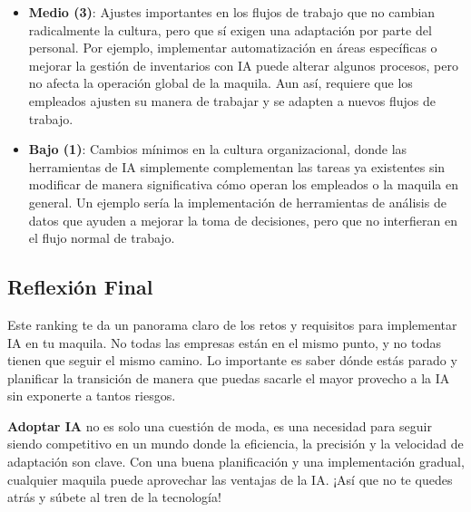 \begin{enumerate}
\begin{itemize}
        \item \textbf{Medio (3)}: Ajustes importantes en los flujos de trabajo que no cambian radicalmente la cultura, pero que sí exigen una adaptación por parte del personal. Por ejemplo, implementar automatización en áreas específicas o mejorar la gestión de inventarios con IA puede alterar algunos procesos, pero no afecta la operación global de la maquila. Aun así, requiere que los empleados ajusten su manera de trabajar y se adapten a nuevos flujos de trabajo.
        
        \item \textbf{Bajo (1)}: Cambios mínimos en la cultura organizacional, donde las herramientas de IA simplemente complementan las tareas ya existentes sin modificar de manera significativa cómo operan los empleados o la maquila en general. Un ejemplo sería la implementación de herramientas de análisis de datos que ayuden a mejorar la toma de decisiones, pero que no interfieran en el flujo normal de trabajo.
    \end{itemize}
\end{enumerate}

\subsection{Reflexión Final}

Este ranking te da un panorama claro de los retos y requisitos para implementar IA en tu maquila. No todas las empresas están en el mismo punto, y no todas tienen que seguir el mismo camino. Lo importante es saber dónde estás parado y planificar la transición de manera que puedas sacarle el mayor provecho a la IA sin exponerte a tantos riesgos.

\textbf{Adoptar IA} no es solo una cuestión de moda, es una necesidad para seguir siendo competitivo en un mundo donde la eficiencia, la precisión y la velocidad de adaptación son clave. Con una buena planificación y una implementación gradual, cualquier maquila puede aprovechar las ventajas de la IA. ¡Así que no te quedes atrás y súbete al tren de la tecnología! 

